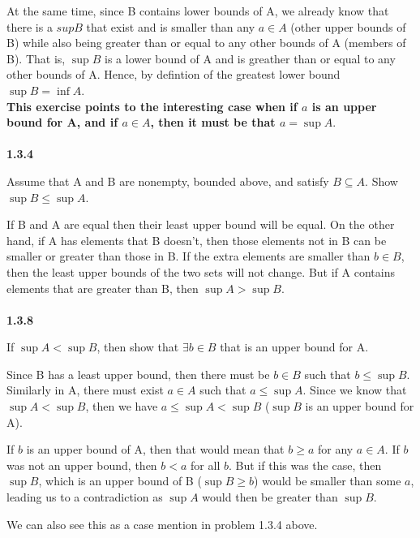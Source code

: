 At the same time, since B contains lower bounds of A, we already know that there is a $sup B$ that exist and is smaller
than any $a \in A$ (other upper bounds of B) while also being greater than or equal to any other bounds of A (members of B).
That is, $\sup B$ is a lower bound of A and is greather than or equal to any other bounds of A.
Hence, by defintion of the greatest lower bound $\sup B = \inf A$.
\\

\textbf{This exercise points to the interesting case when if $a$ is an upper bound for A,
and if $a \in A$, then it must be that $a = \sup A$}.
\\~\\


\textbf{1.3.4}

Assume that A and B are nonempty, bounded above, and satisfy $B \subseteq A$. Show $\sup B \leq \sup A$.

If B and A are equal then their least upper bound will be equal.
On the other hand, if A has elements that B doesn't, then those elements not in B can be smaller or greater than those in B.
If the extra elements are smaller than $b \in B$, then the least upper bounds of the two sets will not change.
But if A contains elements that are greater than B, then $\sup A > \sup B$.
\\~\\


\textbf{1.3.8}

If $\sup A < \sup B$, then show that $\exists b \in B$ that is an upper bound for A.

Since B has a least upper bound, then there must be $b \in B$ such that $b \leq \sup B$.
Similarly in A, there must exist $a \in A$ such that $a \leq \sup A$.
Since we know that $\sup A < \sup B$, then we have $a \leq \sup A < \sup B$ ($\sup B$ is an upper bound for A).

If $b$ is an upper bound of A, then that would mean that $b \geq a$ for any $a \in A$.
If $b$ was not an upper bound, then $b < a$ for all $b$.
But if this was the case, then $\sup B$, which is an upper bound of B ($\sup B \geq b$) would be smaller than some
$a$, leading us to a contradiction as $\sup A$ would then be greater than $\sup B$.

We can also see this as a case mention in problem 1.3.4 above.
\\~\\




